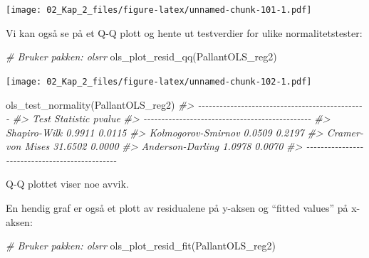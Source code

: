 \documentclass[
]{article}
\newenvironment{Shaded}{\begin{snugshade}}{\end{snugshade}}
\newcommand{\CommentTok}[1]{\textcolor[rgb]{0.56,0.35,0.01}{\textit{#1}}}
\newcommand{\FunctionTok}[1]{\textcolor[rgb]{0.00,0.00,0.00}{#1}}
\newcommand{\NormalTok}[1]{#1}
\newcommand{\SpecialCharTok}[1]{\textcolor[rgb]{0.00,0.00,0.00}{#1}}
\begin{document}
\begin{Shaded}
\end{Shaded}

\texttt{[image: 02\_Kap\_2\_files/figure-latex/unnamed-chunk-101-1.pdf]}

Vi kan også se på et Q-Q plott og hente ut testverdier for ulike normalitetstester:

\begin{Shaded}
\begin{Highlighting}[]
\CommentTok{\# Bruker pakken: olsrr}
\FunctionTok{ols\_plot\_resid\_qq}\NormalTok{(PallantOLS\_reg2)}
\end{Highlighting}
\end{Shaded}

\texttt{[image: 02\_Kap\_2\_files/figure-latex/unnamed-chunk-102-1.pdf]}

\begin{Shaded}
\begin{Highlighting}[]
\FunctionTok{ols\_test\_normality}\NormalTok{(PallantOLS\_reg2)}
\CommentTok{\#\textgreater{} {-}{-}{-}{-}{-}{-}{-}{-}{-}{-}{-}{-}{-}{-}{-}{-}{-}{-}{-}{-}{-}{-}{-}{-}{-}{-}{-}{-}{-}{-}{-}{-}{-}{-}{-}{-}{-}{-}{-}{-}{-}{-}{-}{-}{-}{-}{-}}
\CommentTok{\#\textgreater{}        Test             Statistic       pvalue  }
\CommentTok{\#\textgreater{} {-}{-}{-}{-}{-}{-}{-}{-}{-}{-}{-}{-}{-}{-}{-}{-}{-}{-}{-}{-}{-}{-}{-}{-}{-}{-}{-}{-}{-}{-}{-}{-}{-}{-}{-}{-}{-}{-}{-}{-}{-}{-}{-}{-}{-}{-}{-}}
\CommentTok{\#\textgreater{} Shapiro{-}Wilk              0.9911         0.0115 }
\CommentTok{\#\textgreater{} Kolmogorov{-}Smirnov        0.0509         0.2197 }
\CommentTok{\#\textgreater{} Cramer{-}von Mises         31.6502         0.0000 }
\CommentTok{\#\textgreater{} Anderson{-}Darling          1.0978         0.0070 }
\CommentTok{\#\textgreater{} {-}{-}{-}{-}{-}{-}{-}{-}{-}{-}{-}{-}{-}{-}{-}{-}{-}{-}{-}{-}{-}{-}{-}{-}{-}{-}{-}{-}{-}{-}{-}{-}{-}{-}{-}{-}{-}{-}{-}{-}{-}{-}{-}{-}{-}{-}{-}}
\end{Highlighting}
\end{Shaded}

Q-Q plottet viser noe avvik.

En hendig graf er også et plott av residualene på y-aksen og ``fitted values'' på x-aksen:

\begin{Shaded}
\begin{Highlighting}[]
\CommentTok{\# Bruker pakken: olsrr}
\FunctionTok{ols\_plot\_resid\_fit}\NormalTok{(PallantOLS\_reg2)}
\end{Highlighting}
\end{Shaded}
\end{document}
